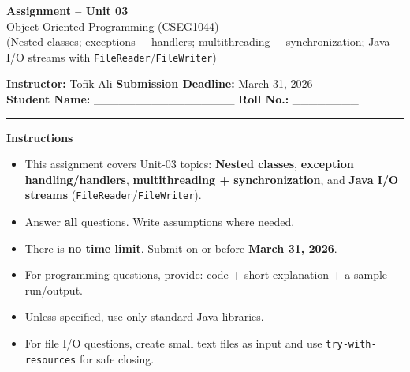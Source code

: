 \documentclass[11pt,a4paper]{article}
\begin{document}
\begin{center}
  {\LARGE \textbf{Assignment -- Unit 03}}\\[0.25em]
  {\large Object Oriented Programming (CSEG1044)}\\[0.25em]
  \normalsize (Nested classes; exceptions + handlers; multithreading + synchronization; Java I/O streams with \texttt{FileReader}/\texttt{FileWriter})
\end{center}

\noindent
\textbf{Instructor:} Tofik Ali \hfill \textbf{Submission Deadline:} March 31, 2026\\
\textbf{Student Name:} \_\_\_\_\_\_\_\_\_\_\_\_\_\_\_\_\_ \hfill \textbf{Roll No.:} \_\_\_\_\_\_\_\_\\

\vspace{0.6em}
\hrule
\vspace{0.8em}

\textbf{Instructions}
\begin{itemize}[leftmargin=*]
  \item This assignment covers Unit-03 topics:
    \textbf{Nested classes}, \textbf{exception handling/handlers}, \textbf{multithreading + synchronization},
    and \textbf{Java I/O streams} (\texttt{FileReader}/\texttt{FileWriter}).
  \item Answer \textbf{all} questions. Write assumptions where needed.
  \item There is \textbf{no time limit}. Submit on or before \textbf{March 31, 2026}.
  \item For programming questions, provide: code + short explanation + a sample run/output.
  \item Unless specified, use only standard Java libraries.
  \item For file I/O questions, create small text files as input and use \texttt{try-with-resources} for safe closing.
\end{itemize}

\vspace{0.6em}
\end{document}
